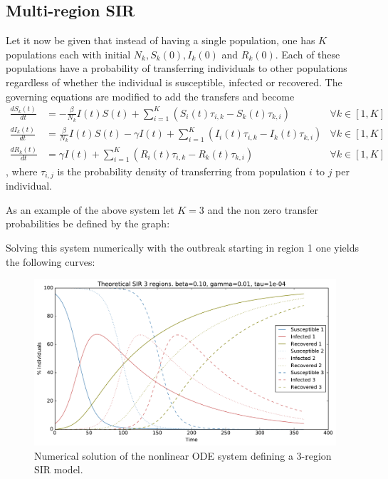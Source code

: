 \subsection{Multi-region SIR}
Let it now be given that instead of having a single population, one has $K$ populations each with initial $N_k, S_k(0), I_k(0)$ and $R_k(0)$. Each of these populations have a probability of transferring individuals to other populations regardless of whether the individual is susceptible, infected or recovered. The governing equations are modified to add the transfers and become
\begin{equation}
\begin{aligned}
\frac{d S_k(t)}{dt} &= - \frac{\beta}{N_k} I(t) S(t) + \sum_{i=1}^K \left( S_i(t)\tau_{i,k} - S_k(t)\tau_{k, i}\right)   &\forall k \in [1, K]\\
\frac{d I_k(t)}{dt} &= \frac{\beta}{N_k} I(t) S(t) - \gamma I(t) + \sum_{i=1}^K \left( I_i(t)\tau_{i,k} - I_k(t)\tau_{k, i}\right)  &\forall k \in [1, K]\\
\frac{d R_k(t)}{dt} &= \gamma I(t) + \sum_{i = 1}^K \left( R_i(t)\tau_{i,k} - R_k(t)\tau_{k, i}\right) &\forall k \in [1, K]
\end{aligned}
\end{equation}
, where $\tau_{i,j}$ is the probability density of transferring from population $i$ to $j$ per individual.

As an example of the above system let $K=3$ and the non zero transfer probabilities be defined by the graph:
\begin{figure}[H]
	\centering
{}
\end{figure}
Solving this system numerically with the outbreak starting in region 1 one yields the following curves:
\begin{figure}[H]
	\centering
	\includegraphics[width= 1.0 \linewidth]{plots/sir_three_region_theory.pdf}
	\caption{Numerical solution of the nonlinear ODE system defining a 3-region SIR model.}
\end{figure}

